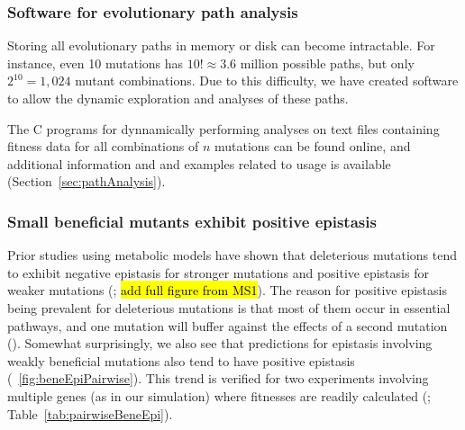 \subsubsection{Software for evolutionary path analysis}

Storing all evolutionary paths in memory or disk can become 
intractable. For instance, even 10 mutations has $10! \approx
3.6$ million possible paths, but only $2^{10} = 1,024$ mutant
combinations. Due to this difficulty, we have created software to allow 
the dynamic exploration and analyses of these paths. 

The C programs for dynnamically performing analyses on text files
containing fitness data for all combinations of $n$ mutations can be
found online, and additional information and and examples related to
usage is available (\suppOrApp Section~\ref{sec:pathAnalysis}).

\subsubsection{Small beneficial mutants exhibit positive epistasis}

Prior studies using metabolic models have shown that deleterious
mutations tend to exhibit negative epistasis for stronger mutations
and positive epistasis for weaker mutations (\citep{He2010, Xu2012};
\hl{add full figure from MS1}). The reason for positive epistasis
being prevalent for deleterious mutations is that most of them occur
in essential pathways, and one mutation will buffer against the
effects of a second mutation (\citep{Xu2012}). Somewhat surprisingly,
we also see that predictions for epistasis involving weakly beneficial
mutations also tend to have positive epistasis
(\Fig~\ref{fig:beneEpiPairwise}). This trend is verified for two
experiments involving
multiple genes (as in our simulation) where fitnesses are readily
calculated (\citep{Chou2011, Khan2011}; Table~\ref{tab:pairwiseBeneEpi}).

